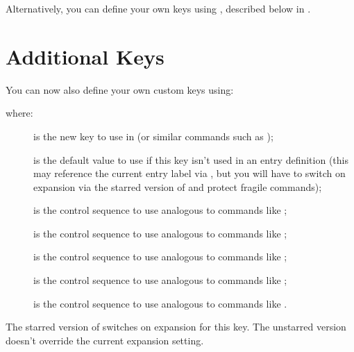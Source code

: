 \documentclass[report,inlinetitle]{nlctdoc}
\begin{document}
Alternatively, you can define your own keys using
, described below in .

\section{Additional Keys}
\label{sec:addkey}

You can now also define your own custom keys using:
\begin{definition}[\DescribeMacro\glsaddkey]
%
%
%
%
%
%
\end{definition}
where:
\begin{description}
\item[] is the new key to use in 
(or similar commands such as );
\item[] is the default value to use if this key
isn't used in an entry definition (this may reference the current
entry label via , but you will have to switch on
expansion via the starred version of  and protect
fragile commands);
\item[] is the control sequence to use analogous
to commands like ;
\item[] is the control sequence to use analogous
to commands like ;
\item[] is the control sequence to use analogous
to commands like ;
\item[] is the control sequence to use analogous
to commands like ;
\item[] is the control sequence to use analogous
to commands like .
\end{description}
The starred version of  switches on expansion for this
key. The unstarred version doesn't override the current expansion
setting.
\end{document}
